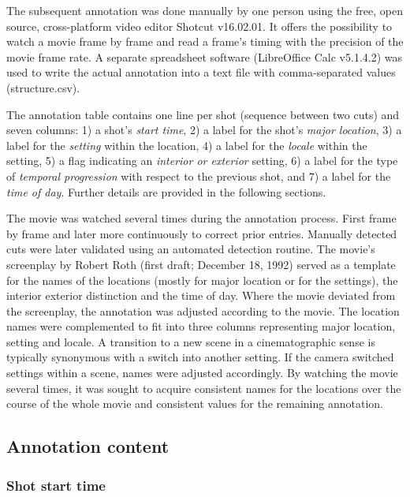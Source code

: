 \documentclass[10pt,a4paper,twocolumn]{article}
\begin{document}
The subsequent annotation was done manually by one person using the
free, open source, cross-platform video editor Shotcut v16.02.01.
It offers the possibility to watch a movie frame by frame and read
a frame's timing with the precision of the movie frame rate. A separate
spreadsheet software (LibreOffice Calc v5.1.4.2) was used
to write the actual annotation into a text file with comma-separated
values (structure.csv). 

The annotation table contains one line per shot (sequence between two cuts) and
seven columns: 1) a shot's \textit{start time}, 2) a label for the shot's
\textit{major location}, 3) a label for the \textit{setting} within the
location, 4) a label for the \textit{locale} within the setting, 5) a flag
indicating an \textit{interior or exterior} setting, 6) a label for the type of
\textit{temporal progression} with respect to the previous shot, and 7) a label
for the \textit{time of day}. Further details are provided in the following
sections.

The movie was watched several times during the annotation process. First 
frame by frame and later more continuously to correct prior entries. 
Manually detected cuts were later validated using an automated detection routine.
The movie's screenplay by Robert Roth (first
draft; December 18, 1992) served as a template for the names of the
locations (mostly for major location or for the settings), the interior exterior distinction
and the time of day. Where the movie deviated from the screenplay,
the annotation was adjusted according to the movie. The location names were complemented
to fit into three columns representing major location, setting and locale. A transition to 
a new scene in a cinematographic sense is typically synonymous with a switch into another setting. 
If the camera switched settings within a scene, names  were adjusted accordingly. 
By watching the movie several times, it was sought to acquire consistent names 
for the locations over the course of the whole movie and consistent values for 
the remaining annotation.


\subsection*{Annotation content}


\subsubsection*{Shot start time}
\end{document}
